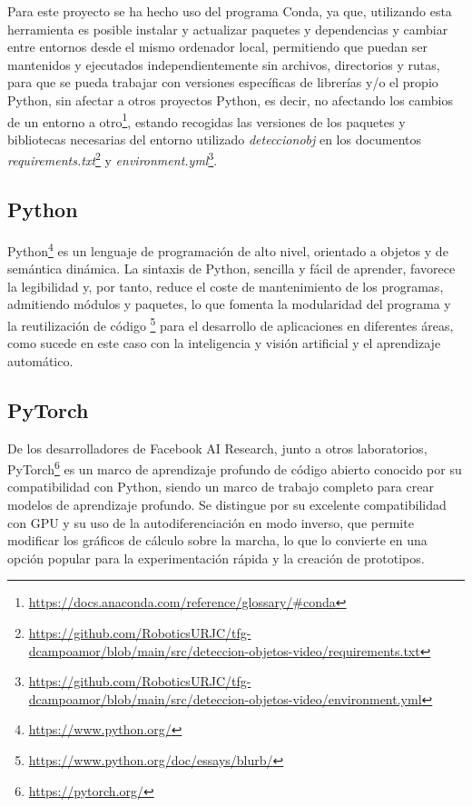 Para este proyecto se ha hecho uso del programa Conda, ya que, utilizando esta herramienta es posible instalar y actualizar paquetes y dependencias y cambiar entre entornos desde el mismo ordenador local, permitiendo que puedan ser mantenidos y ejecutados independientemente sin archivos, directorios y rutas, para que se pueda trabajar con versiones específicas de librerías y/o el propio Python, sin afectar a otros proyectos Python, es decir, no afectando los cambios de un entorno a otro\footnote{\url{https://docs.anaconda.com/reference/glossary/\#conda}}, estando recogidas las versiones de los paquetes y bibliotecas necesarias del entorno utilizado \textit{deteccionobj} en los documentos \textit{requirements.txt}\footnote{\url{https://github.com/RoboticsURJC/tfg-dcampoamor/blob/main/src/deteccion-objetos-video/requirements.txt}} y \textit{environment.yml}\footnote{\url{https://github.com/RoboticsURJC/tfg-dcampoamor/blob/main/src/deteccion-objetos-video/environment.yml}}. 


\subsection{Python}
\label{sec:python}
Python\footnote{\url{https://www.python.org/}} es un lenguaje de programación de alto nivel, orientado a objetos y de semántica dinámica. La sintaxis de Python, sencilla y fácil de aprender, favorece la legibilidad y, por tanto, reduce el coste de mantenimiento de los programas, admitiendo módulos y paquetes, lo que fomenta la modularidad del programa y la reutilización de código \footnote{\url{https://www.python.org/doc/essays/blurb/}} para el desarrollo de aplicaciones en diferentes áreas, como sucede en este caso con la inteligencia y visión artificial y el aprendizaje automático. 

\subsection{PyTorch}
\label{sec:PyTorch}

De los desarrolladores de Facebook AI Research, junto a otros laboratorios, PyTorch\footnote{\url{https://pytorch.org/}} es un marco de aprendizaje profundo de código abierto conocido por su compatibilidad con Python, siendo un marco de trabajo completo para crear modelos de aprendizaje profundo. Se distingue por su excelente compatibilidad con GPU y su uso de la autodiferenciación en modo inverso, que permite modificar los gráficos de cálculo sobre la marcha, lo que lo convierte en una opción popular para la experimentación rápida y la creación de prototipos.

